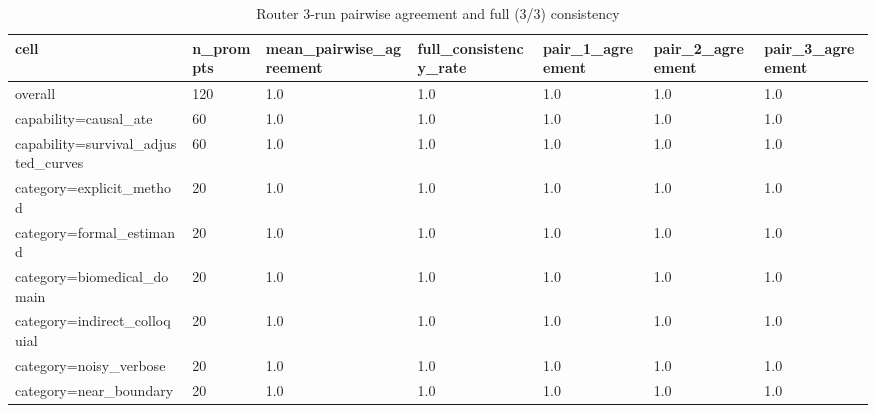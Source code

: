 \begin{table}[ht]
\centering
\caption{Router 3-run pairwise agreement and full (3/3) consistency}
\label{tab:router_consistency}
\begin{tabular}{lllllll}
\toprule
cell & n\_prompts & mean\_pairwise\_agreement & full\_consistency\_rate & pair\_1\_agreement & pair\_2\_agreement & pair\_3\_agreement \\
\midrule
overall & 120 & 1.0 & 1.0 & 1.0 & 1.0 & 1.0 \\
capability=causal\_ate & 60 & 1.0 & 1.0 & 1.0 & 1.0 & 1.0 \\
capability=survival\_adjusted\_curves & 60 & 1.0 & 1.0 & 1.0 & 1.0 & 1.0 \\
category=explicit\_method & 20 & 1.0 & 1.0 & 1.0 & 1.0 & 1.0 \\
category=formal\_estimand & 20 & 1.0 & 1.0 & 1.0 & 1.0 & 1.0 \\
category=biomedical\_domain & 20 & 1.0 & 1.0 & 1.0 & 1.0 & 1.0 \\
category=indirect\_colloquial & 20 & 1.0 & 1.0 & 1.0 & 1.0 & 1.0 \\
category=noisy\_verbose & 20 & 1.0 & 1.0 & 1.0 & 1.0 & 1.0 \\
category=near\_boundary & 20 & 1.0 & 1.0 & 1.0 & 1.0 & 1.0 \\
\bottomrule
\end{tabular}
\end{table}
